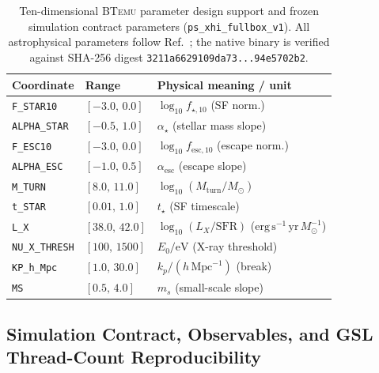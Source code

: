 \documentclass[aps,prd,reprint,superscriptaddress,nofootinbib,amsmath,amssymb,floatfix,longbibliography]{revtex4-2}
\begin{document}
\begin{table}[!tbp]
\caption{Ten-dimensional \textsc{BTemu} parameter design support and frozen simulation contract parameters (\texttt{ps\_xhi\_fullbox\_v1}). All astrophysical parameters follow Ref.~\cite{Park2019}; the native binary is verified against SHA-256 digest \texttt{3211a6629109da73...94e5702b2}.}
\label{tab:params}
\footnotesize
\setlength{\tabcolsep}{3.5pt}
\begin{ruledtabular}
\begin{tabular}{llp{4.05cm}}
Coordinate & Range & Physical meaning / unit \\
\hline
\texttt{F\_STAR10} & $[-3.0,\, 0.0]$ & $\log_{10} f_{\star,10}$ (SF norm.) \\
\texttt{ALPHA\_STAR} & $[-0.5,\, 1.0]$ & $\alpha_\star$ (stellar mass slope) \\
\texttt{F\_ESC10} & $[-3.0,\, 0.0]$ & $\log_{10} f_{\mathrm{esc},10}$ (escape norm.) \\
\texttt{ALPHA\_ESC} & $[-1.0,\, 0.5]$ & $\alpha_{\mathrm{esc}}$ (escape slope) \\
\texttt{M\_TURN} & $[8.0,\, 11.0]$ & $\log_{10}(M_{\mathrm{turn}}/M_\odot)$ \\
\texttt{t\_STAR} & $[0.01,\, 1.0]$ & $t_\star$ (SF timescale) \\
\texttt{L\_X} & $[38.0,\, 42.0]$ & $\log_{10}(L_X/\mathrm{SFR})$ ($\mathrm{erg\,s^{-1}\,yr}\,M_\odot^{-1}$) \\
\texttt{NU\_X\_THRESH} & $[100,\, 1500]$ & $E_0/\mathrm{eV}$ (X-ray threshold) \\
\texttt{KP\_h\_Mpc} & $[1.0,\, 30.0]$ & $k_p/(h\,\mathrm{Mpc}^{-1})$ (break) \\
\texttt{MS} & $[0.5,\, 4.0]$ & $m_s$ (small-scale slope) \\
\end{tabular}
\end{ruledtabular}
\end{table}

\subsection{Simulation Contract, Observables, and GSL Thread-Count Reproducibility}\label{sec:contract}
\end{document}
